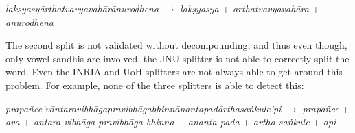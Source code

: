 \documentclass[11pt]{article}
\begin{document}
\textit{lak\d{s}yasy\={a}rthatvavyavah\={a}r\={a}nurodhena} $\rightarrow$  \textit{lak\d{s}yasya} + \textit{arthatvavyavah\={a}ra} + \textit{anurodhena} 

The second split is not validated without decompounding, and thus even though, only vowel sandhis are involved, the JNU splitter is not able to correctly split the word.  
Even the INRIA and UoH splitters are not always able to get around this problem.
For example, none of the three splitters is able to detect this:

\textit{prapa\~{n}ce'v\={a}ntaravibh\={a}gapravibh\={a}gabhinn\={a}nantapad\={a}rthasa\.{n}kule'pi} $\rightarrow$ \textit{prapa\~{n}ce} + \textit{ava} + \textit{antara-vibh\={a}ga-pravibh\={a}ga-bhinna} + \textit{ananta-pada} + \textit{artha-sa\.{n}kule} + \textit{api}
\end{document}
